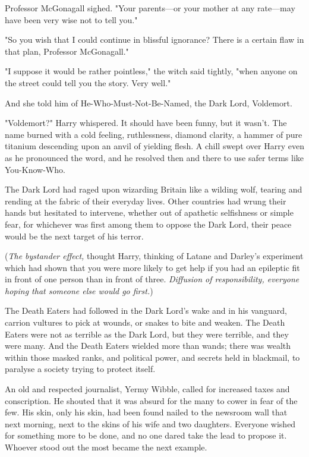 Professor McGonagall sighed. "Your parents—or your mother at any rate—may
have been very wise not to tell you."

"So you wish that I could continue in blissful ignorance? There is a certain
flaw in that plan, Professor McGonagall."

"I suppose it would be rather pointless," the witch said tightly, "when anyone
on the street could tell you the story. Very well."

And she told him of He-Who-Must-Not-Be-Named, the Dark Lord, Voldemort.

"Voldemort?" Harry whispered. It should have been funny, but it wasn't. The
name burned with a cold feeling, ruthlessness, diamond clarity, a hammer of
pure titanium descending upon an anvil of yielding flesh. A chill swept over
Harry even as he pronounced the word, and he resolved then and there to use
safer terms like You-Know-Who.

The Dark Lord had raged upon wizarding Britain like a wilding wolf, tearing and
rending at the fabric of their everyday lives. Other countries had wrung their
hands but hesitated to intervene, whether out of apathetic selfishness or
simple fear, for whichever was first among them to oppose the Dark Lord, their
peace would be the next target of his terror.

(\emph{The bystander effect,} thought Harry, thinking of Latane and Darley's
experiment which had shown that you were more likely to get help if you had an
epileptic fit in front of one person than in front of three. \emph{Diffusion of
responsibility, everyone hoping that someone else would go first.})

The Death Eaters had followed in the Dark Lord's wake and in his vanguard,
carrion vultures to pick at wounds, or snakes to bite and weaken. The Death
Eaters were not as terrible as the Dark Lord, but they were terrible, and they
were many. And the Death Eaters wielded more than wands; there was wealth
within those masked ranks, and political power, and secrets held in blackmail,
to paralyse a society trying to protect itself.

An old and respected journalist, Yermy Wibble, called for increased taxes and
conscription. He shouted that it was absurd for the many to cower in fear of
the few. His skin, only his skin, had been found nailed to the newsroom wall
that next morning, next to the skins of his wife and two daughters. Everyone
wished for something more to be done, and no one dared take the lead to propose
it. Whoever stood out the most became the next example.

